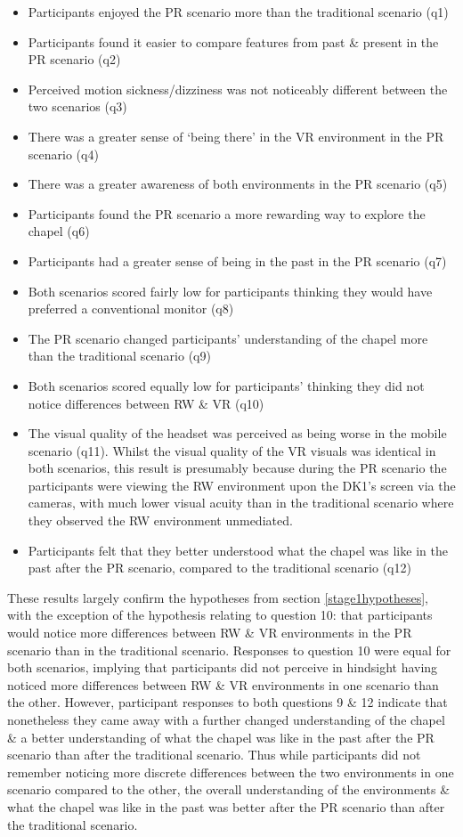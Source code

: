 \begin{itemize}
	\item Participants enjoyed the PR scenario more than the traditional scenario (q1)
	\item Participants found it easier to compare features from past \& present in the PR scenario (q2)
	\item Perceived motion sickness/dizziness was not noticeably different between the two scenarios (q3)
	\item There was a greater sense of `being there' in the VR environment in the PR scenario (q4)
	\item There was a greater awareness of both environments in the PR scenario (q5)
	\item Participants found the PR scenario a more rewarding way to explore the chapel (q6)
	\item Participants had a greater sense of being in the past in the PR scenario (q7)
	\item Both scenarios scored fairly low for participants thinking they would have preferred a conventional monitor (q8)
	\item The PR scenario changed participants’ understanding of the chapel more than the traditional scenario (q9)
	\item Both scenarios scored equally low for participants’ thinking they did not notice differences between RW \& VR (q10)
	\item The visual quality of the headset was perceived as being worse in the mobile scenario (q11). Whilst the visual quality of the VR visuals was identical in both scenarios, this result is presumably because during the PR scenario the participants were viewing the RW environment upon the DK1's screen via the cameras, with much lower visual acuity than in the traditional scenario where they observed the RW environment unmediated.
	\item Participants felt that they better understood what the chapel was like in the past after the PR scenario, compared to the traditional scenario (q12)
\end{itemize}

These results largely confirm the hypotheses from section \ref{stage1hypotheses}, with the exception of the hypothesis relating to question 10: that participants would notice more differences between RW \& VR environments in the PR scenario than in the traditional scenario. Responses to question 10 were equal for both scenarios, implying that participants did not perceive in hindsight having noticed more differences between RW \& VR environments in one scenario than the other. However, participant responses to both questions 9 \& 12 indicate that nonetheless they came away with a further changed understanding of the chapel \& a better understanding of what the chapel was like in the past after the PR scenario than after the traditional scenario. Thus while participants did not remember noticing more discrete differences between the two environments in one scenario compared to the other, the overall understanding of the environments \& what the chapel was like in the past was better after the PR scenario than after the traditional scenario.


